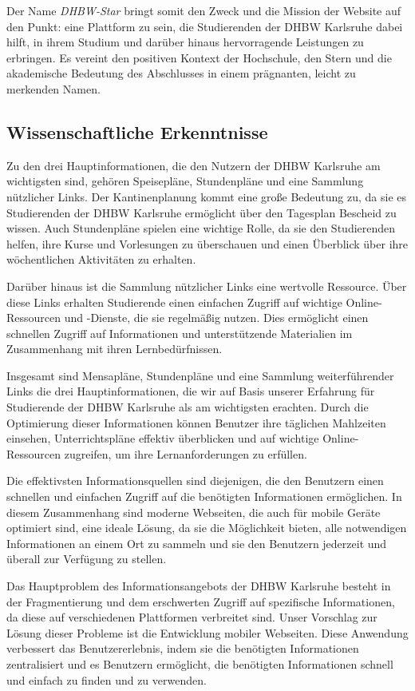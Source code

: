 Der Name \emph{DHBW-Star} bringt somit den Zweck und die Mission der Website auf den Punkt: eine Plattform zu sein, die Studierenden der DHBW Karlsruhe dabei hilft, in ihrem Studium und darüber hinaus hervorragende Leistungen zu erbringen. Es vereint den positiven Kontext der Hochschule, den Stern und die akademische Bedeutung des Abschlusses in einem prägnanten, leicht zu merkenden Namen.
\newpage
\subsection{Wissenschaftliche Erkenntnisse} 
Zu den drei Hauptinformationen, die den Nutzern der DHBW Karlsruhe am wichtigsten sind, gehören Speisepläne, Stundenpläne und eine Sammlung nützlicher Links. Der Kantinenplanung kommt eine große Bedeutung zu, da sie es Studierenden der DHBW Karlsruhe ermöglicht über den Tagesplan Bescheid zu wissen. Auch Stundenpläne spielen eine wichtige Rolle, da sie den Studierenden helfen, ihre Kurse und Vorlesungen zu überschauen und einen Überblick über ihre wöchentlichen Aktivitäten zu erhalten.

Darüber hinaus ist die Sammlung nützlicher Links eine wertvolle Ressource. Über diese Links erhalten Studierende einen einfachen Zugriff auf wichtige Online-Ressourcen und -Dienste, die sie regelmäßig nutzen. Dies ermöglicht einen schnellen Zugriff auf Informationen und unterstützende Materialien im Zusammenhang mit ihren Lernbedürfnissen.
 
Insgesamt sind Mensapläne, Stundenpläne und eine Sammlung weiterführender Links die drei Hauptinformationen, die wir auf Basis unserer Erfahrung für Studierende der DHBW Karlsruhe als am wichtigsten erachten. Durch die Optimierung dieser Informationen können Benutzer ihre täglichen Mahlzeiten einsehen, Unterrichtspläne effektiv überblicken und auf wichtige Online-Ressourcen zugreifen, um ihre Lernanforderungen zu erfüllen.

Die effektivsten Informationsquellen sind diejenigen, die den Benutzern einen schnellen und einfachen Zugriff auf die benötigten Informationen ermöglichen. In diesem Zusammenhang sind moderne Webseiten, die auch für mobile Geräte optimiert sind, eine ideale Lösung, da sie die Möglichkeit bieten, alle notwendigen Informationen an einem Ort zu sammeln und sie den Benutzern jederzeit und überall zur Verfügung zu stellen.

Das Hauptproblem des Informationsangebots der DHBW Karlsruhe besteht in der Fragmentierung und dem erschwerten Zugriff auf spezifische Informationen, da diese auf verschiedenen Plattformen verbreitet sind. Unser Vorschlag zur Lösung dieser Probleme ist die Entwicklung mobiler Webseiten. Diese Anwendung verbessert das Benutzererlebnis, indem sie die benötigten Informationen zentralisiert und es Benutzern ermöglicht, die benötigten Informationen schnell und einfach zu finden und zu verwenden.

